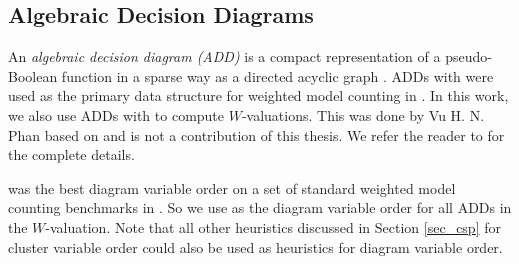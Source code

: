\subsection{Algebraic Decision Diagrams}
An \emph{algebraic decision diagram (ADD)} is a compact representation of a pseudo-Boolean function in a sparse way as a directed acyclic graph \cite{bahar1997algebraic}.
ADDs with \cudd{} were used as the primary data structure for weighted model counting in \cite{DPV20}.
In this work, we also use ADDs with \cudd{} to compute $W$-valuations.
This was done by Vu H. N. Phan based on \cite{DPV20} and is not a contribution of this thesis. We refer the reader to \cite{dudek2020dpmc} for the complete details.

\Mcs{} was the best diagram variable order on a set of standard weighted model counting benchmarks in \cite{DPV20}.
So we use \Mcs{} as the diagram variable order for all ADDs in the $W$-valuation.
Note that all other heuristics discussed in Section \ref{sec_csp} for cluster variable order could also be used as heuristics for diagram variable order.

